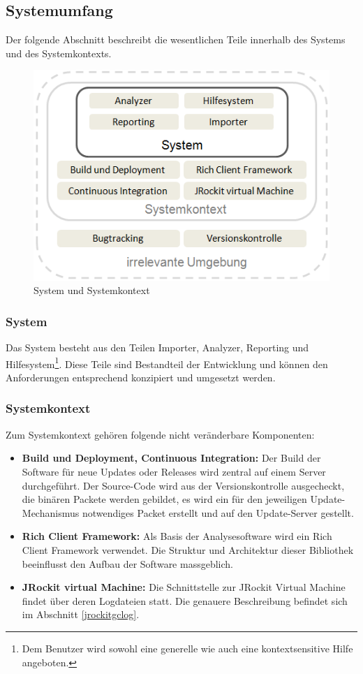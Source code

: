 \subsection{Systemumfang}
Der folgende Abschnitt beschreibt die wesentlichen Teile innerhalb des Systems und des Systemkontexts. 
 \begin{figure}[H]
  	\centering
    	\includegraphics{images/systemumfang}
        	\caption{System und Systemkontext}
\end{figure}
\subsubsection{System}
Das System besteht aus den Teilen Importer, Analyzer, Reporting und Hilfesystem\footnote{Dem Benutzer wird sowohl eine generelle wie auch eine kontextsensitive Hilfe angeboten.}. Diese Teile sind Bestandteil der Entwicklung und können den Anforderungen entsprechend konzipiert und umgesetzt werden.

\subsubsection{Systemkontext}
Zum Systemkontext gehören folgende nicht veränderbare Komponenten:
\begin{itemize}
	\item \textbf{Build und Deployment, Continuous Integration:} Der Build der Software für neue Updates oder Releases wird zentral auf einem Server durchgeführt. Der Source-Code wird aus der Versionskontrolle ausgecheckt, die binären Packete werden gebildet, es wird ein für den jeweiligen Update-Mechanismus notwendiges Packet erstellt und auf den Update-Server gestellt.

	\item \textbf{Rich Client Framework:} Als Basis der Analysesoftware wird ein Rich Client Framework verwendet. Die Struktur und Architektur dieser Bibliothek beeinflusst den Aufbau der Software massgeblich.
	\item \textbf{JRockit virtual Machine:} Die Schnittstelle zur JRockit Virtual Machine findet über deren Logdateien statt. Die genauere Beschreibung befindet sich im Abschnitt \ref{jrockitgclog}.
\end{itemize}

